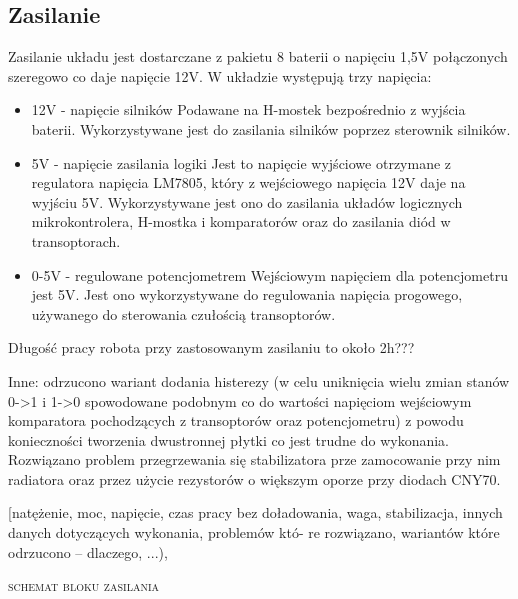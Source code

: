 \documentclass[11pt,a4paper]{article}
\begin{document}
\subsection{Zasilanie}
Zasilanie układu jest dostarczane z pakietu 8 baterii o napięciu 1,5V połączonych szeregowo co daje napięcie 12V.
 W układzie występują trzy napięcia:
  \begin{itemize} 
  \item 12V - napięcie silników
  Podawane na H-mostek bezpośrednio z wyjścia baterii.
  Wykorzystywane jest do zasilania silników poprzez sterownik silników.
  \item 5V - napięcie zasilania logiki
  Jest to napięcie wyjściowe otrzymane z regulatora napięcia LM7805, który z wejściowego napięcia 12V daje na wyjściu 5V.
  Wykorzystywane jest ono do zasilania układów logicznych mikrokontrolera, H-mostka i komparatorów oraz do zasilania diód w transoptorach.
  \item 0-5V - regulowane potencjometrem
  Wejściowym napięciem dla potencjometru jest 5V. Jest ono wykorzystywane do regulowania napięcia progowego, używanego do sterowania czułością transoptorów.
  \end{itemize}

  Długość pracy robota przy zastosowanym zasilaniu to około 2h???

Inne: odrzucono wariant dodania histerezy (w celu uniknięcia wielu zmian stanów 0->1 i 1->0 spowodowane podobnym co do wartości napięciom wejściowym komparatora pochodzących z transoptorów oraz potencjometru) z powodu konieczności tworzenia dwustronnej płytki co jest trudne do wykonania.
Rozwiązano problem przegrzewania się stabilizatora prze zamocowanie przy nim radiatora oraz przez użycie rezystorów o większym oporze przy diodach CNY70.

[natężenie, moc, napięcie, czas pracy
bez doładowania, waga, stabilizacja, innych danych dotyczących wykonania, problemów któ-
re rozwiązano, wariantów które odrzucono – dlaczego, ...), 
    
  \textsc{schemat bloku zasilania}
\end{document}
